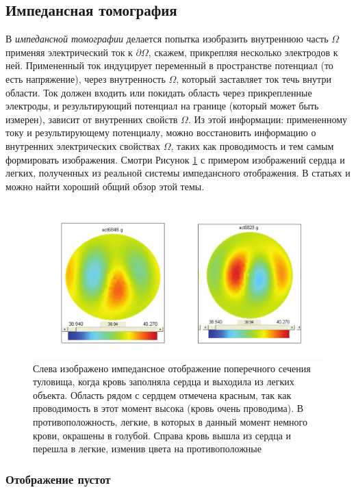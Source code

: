 \documentclass[a4paper, 12pt]{article}
\begin{document}
\subsection{Импедансная томография}


В \textit{импедансной томографии} делается попытка изобразить внутреннюю часть 
$\Omega$ применяя
электрический ток к $\partial \Omega$, скажем, прикрепляя несколько электродов к ней. 
Примененный ток
индуцирует переменный в пространстве потенциал (то есть напряжение), через 
внутренность $\Omega$, который
заставляет ток течь внутри области. Ток должен входить или покидать область через 
прикрепленные электроды, и
результирующий потенциал на границе (который может быть измерен), зависит от 
внутренних свойств $\Omega$. Из
этой информации: примененному току и результирующему потенциалу, можно восстановить 
информацию о внутренних
электрических свойствах $\Omega$, таких как проводимость и тем самым формировать 
изображения. Смотри Рисунок
\ref{fig:2} с примером изображений сердца и легких, полученных из реальной системы 
импедансного отображения.
В статьях \cite{5} и \cite{11} можно найти хороший общий обзор этой темы.
\begin{figure}[t]
  \centering
  \includegraphics[height=0.15\paperheight]{2.png}
  \caption{Слева изображено импедансное отображение поперечного сечения туловища, 
  когда кровь заполняла сердца и выходила из легких объекта.
  Область рядом с сердцем отмечена красным, так как проводимость в этот момент высока 
 (кровь очень проводима). В противоположность, легкие, в которых в данный момент 
 немного крови, окрашены в голубой. Справа
кровь вышла из сердца и перешла в легкие, изменив цвета на противоположные}
  \label{fig:2}
\end{figure}

\subsubsection{Отображение пустот}
\end{document}
